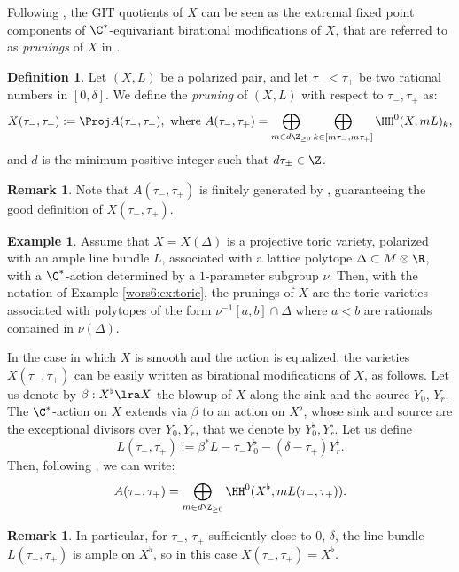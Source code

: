 \documentclass[reqno]{amsproc}
\theoremstyle{definition}
\newtheorem{definition}[theorem]{Definition}
\newtheorem{remark}[theorem]{Remark}
\newtheorem{example}[theorem]{Example}
\begin{document}
Following \cite{wors6-WORS3}, the GIT quotients of $X$ can be seen as the extremal fixed point components of $\C^*$-equivariant birational modifications of $X$, that are referred to as {\em prunings} of $X$ in \cite{wors6-BRUS}.

\begin{definition}\label{wors6:def:pruning}
Let $(X,L)$ be a polarized pair, and let $\tau_-<\tau_+$ be two rational numbers in $[0,\delta]$. We define the {\em pruning} of $(X,L)$ with respect to $\tau_-,\tau_+$ as: 
	$$
	X(\tau_-,\tau_+):=\Proj A(\tau_-,\tau_+),\ \mbox{where}\ A(\tau_-,\tau_+)=\bigoplus_{m\in d\Z_{\geq 0}}\bigoplus_{k \in[m\tau_-, m\tau_+]}\HH^0(X,mL)_k,
	$$	
and $d$ is the minimum positive integer such that $d\tau_\pm\in \Z$.
\end{definition}
	
\begin{remark}\label{wors6:rem:pruning} Note that $A(\tau_-,\tau_+)$ is finitely generated by \cite[Lemma 3.2]{wors6-BRUS}, guaranteeing the good definition of $X(\tau_-,\tau_+)$.  
\end{remark}

\begin{example}\label{wors6:ex:toric1}
Assume that $X=X(\Delta)$ is a projective toric variety, polarized with an ample line bundle $L$, associated with a lattice polytope $\Delta\subset M\otimes \R$,  with a $\C^*$-action determined by a $1$-parameter subgroup $\nu$. Then, with the notation of Example \ref{wors6:ex:toric}, the prunings of $X$ are the  toric varieties associated with polytopes of the form $\nu^{-1}[a,b]\cap\Delta$ where $a<b$ are rationals contained in $\nu(\Delta)$. 
\end{example}

In the case in which $X$ is smooth and the action is equalized, the varieties $X(\tau_-,\tau_+)$ can be easily written as birational modifications of $X$, as follows. Let us denote by $\beta:X^\flat\lra X$ the blowup of $X$ along the sink and the source $Y_0$, $Y_r$. The $\C^*$-action on $X$ extends via $\beta$ to an action on $X^\flat$, whose sink and source are the exceptional divisors over $Y_0,Y_r$, that we denote by $Y^\flat_0,Y^\flat_r$. Let us define
\[
L(\tau_-,\tau_+):=\beta^*L-\tau_-Y^\flat_0-(\delta-\tau_+)Y^\flat_r.
\]
Then, following \cite[Lemma 2.5]{wors6-WORS3}, we can write:
\[
A(\tau_-,\tau_+)=\bigoplus_{m\in d\Z_{\geq 0}}\HH^0(X^\flat,mL(\tau_-,\tau_+)).\]

\begin{remark}\label{wors6:rem:Xflat}
In particular, for $\tau_-$, $\tau_+$ sufficiently close to $0$, $\delta$, the line bundle $L(\tau_-,\tau_+)$ is ample on $X^\flat$, so in this case  $X(\tau_-,\tau_+)=X^\flat$. 
\end{remark}
\end{document}
